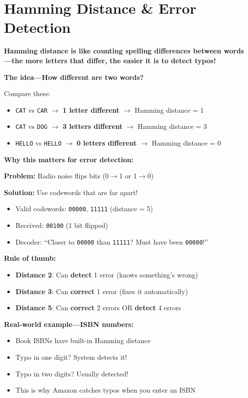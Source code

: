\chapter{Hamming Distance \& Error Detection}
\label{ch:hamming-distance}

\begin{nontechnical}
\textbf{Hamming distance is like counting spelling differences between words---the more letters that differ, the easier it is to detect typos!}

\textbf{The idea---How different are two words?}

Compare these:
\begin{itemize}
\item \texttt{CAT} vs \texttt{CAR} $\rightarrow$ \textbf{1 letter different} $\rightarrow$ Hamming distance = 1
\item \texttt{CAT} vs \texttt{DOG} $\rightarrow$ \textbf{3 letters different} $\rightarrow$ Hamming distance = 3
\item \texttt{HELLO} vs \texttt{HELLO} $\rightarrow$ \textbf{0 letters different} $\rightarrow$ Hamming distance = 0
\end{itemize}

\textbf{Why this matters for error detection:}

\textbf{Problem:} Radio noise flips bits (0$\rightarrow$1 or 1$\rightarrow$0)

\textbf{Solution:} Use codewords that are far apart!
\begin{itemize}
\item Valid codewords: \texttt{00000}, \texttt{11111} (distance = 5)
\item Received: \texttt{00100} (1 bit flipped)
\item Decoder: ``Closer to \texttt{00000} than \texttt{11111}? Must have been \texttt{00000}!''
\end{itemize}

\textbf{Rule of thumb:}
\begin{itemize}
\item \textbf{Distance 2}: Can \textbf{detect} 1 error (knows something's wrong)
\item \textbf{Distance 3}: Can \textbf{correct} 1 error (fixes it automatically)
\item \textbf{Distance 5}: Can \textbf{correct} 2 errors OR \textbf{detect} 4 errors
\end{itemize}

\textbf{Real-world example---ISBN numbers:}
\begin{itemize}
\item Book ISBNs have built-in Hamming distance
\item Typo in one digit? System detects it!
\item Typo in two digits? Usually detected!
\item This is why Amazon catches typos when you enter an ISBN
\end{itemize}


\end{nontechnical}
